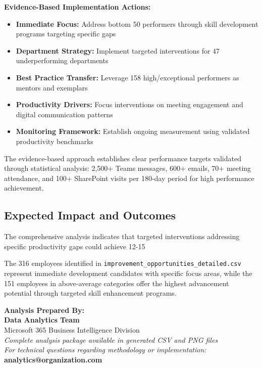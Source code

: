 \documentclass[12pt,a4paper]{article}
\begin{document}
\begin{featurebox}
\textbf{Evidence-Based Implementation Actions:}
\begin{itemize}
    \item \textbf{Immediate Focus:} Address bottom 50 performers through skill development programs targeting specific gaps
    \item \textbf{Department Strategy:} Implement targeted interventions for 47 underperforming departments
    \item \textbf{Best Practice Transfer:} Leverage 158 high/exceptional performers as mentors and exemplars
    \item \textbf{Productivity Drivers:} Focus interventions on meeting engagement and digital communication patterns
    \item \textbf{Monitoring Framework:} Establish ongoing measurement using validated productivity benchmarks
\end{itemize}
\end{featurebox}

The evidence-based approach establishes clear performance targets validated through statistical analysis: 2,500+ Teams messages, 600+ emails, 70+ meeting attendance, and 100+ SharePoint visits per 180-day period for high performance achievement.

\subsection{Expected Impact and Outcomes}

The comprehensive analysis indicates that targeted interventions addressing specific productivity gaps could achieve 12-15%

The 316 employees identified in \texttt{improvement\_opportunities\_detailed.csv} represent immediate development candidates with specific focus areas, while the 151 employees in above-average categories offer the highest advancement potential through targeted skill enhancement programs.

\vspace{1cm}

\begin{center}
\large\textbf{\color{primaryBlue}Analysis Prepared By:}\\[0.5cm]
\textbf{Data Analytics Team}\\
Microsoft 365 Business Intelligence Division\\[0.4cm]
\textit{Complete analysis package available in generated CSV and PNG files}\\[0.2cm]
\textit{For technical questions regarding methodology or implementation:}\\
\textcolor{accentBlue}{\textbf{analytics@organization.com}}
\end{center}
\end{document}
